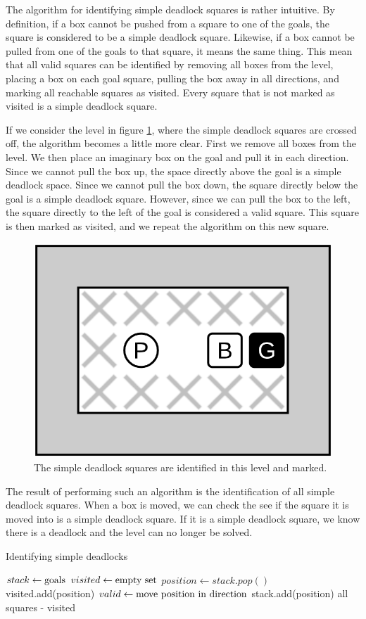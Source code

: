 \documentclass[times, 10pt,twocolumn]{article}
\begin{document}
The algorithm for identifying simple deadlock squares is rather intuitive. By definition, if a box cannot be pushed from a square to one of the goals, the square is considered to be a simple deadlock square. Likewise, if a box cannot be pulled from one of the goals to that square, it means the same thing. This mean that all valid squares can be identified by removing all boxes from the level, placing a box on each goal square, pulling the box away in all directions, and marking all reachable squares as visited. Every square that is not marked as visited is a simple deadlock square. 

If we consider the level in figure \ref{fig:sd}, where the simple deadlock squares are crossed off, the algorithm becomes a little more clear. First we remove all boxes from the level. We then place an imaginary box on the goal and pull it in each direction. Since we cannot pull the box up, the space directly above the goal is a simple deadlock space. Since we cannot pull the box down, the square directly below the goal is a simple deadlock square. However, since we can pull the box to the left, the square directly to the left of the goal is considered a valid square. This square is then marked as visited, and we repeat the algorithm on this new square. 

\begin{figure}[h] 
  \centering
     \includegraphics[width=0.5\linewidth]{simple_deadlock.png}
  \caption{The simple deadlock squares are identified in this level and marked.}
  \label{fig:sd}
\end{figure}

The result of performing such an algorithm is the identification of all simple deadlock squares. When a box is moved, we can check the see if the square it is moved into is a simple deadlock square. If it is a simple deadlock square, we know there is a deadlock and the level can no longer be solved.

\begin{algorithm}
  \caption{Identifying simple deadlocks}
\begin{algorithmic}[1]
    \State $stack\gets \textnormal{goals}$
    \State $visited\gets \textnormal{empty set}$
      \State $position\gets stack.pop()$
      \State visited.add(position)
          \State $valid\gets \textnormal{move position in direction}$
          \State stack.add(position)
        \EndIf
      \EndFor
    \EndWhile
    \State \Return all squares - visited
  \EndFunction
  \end{algorithmic}
\end{algorithm}
\end{document}
